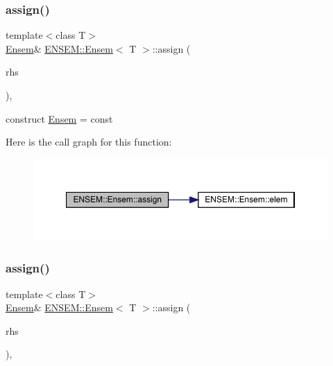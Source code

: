 \subsubsection{\texorpdfstring{assign()}{assign()}\hspace{0.1cm}{\footnotesize\ttfamily [7/12]}}
{\footnotesize\ttfamily template$<$class T$>$ \\
\mbox{\hyperlink{classENSEM_1_1Ensem}{Ensem}}\& \mbox{\hyperlink{classENSEM_1_1Ensem}{E\+N\+S\+E\+M\+::\+Ensem}}$<$ T $>$\+::assign (\begin{DoxyParamCaption}\item[{const typename \mbox{\hyperlink{structENSEM_1_1WordType}{Word\+Type}}$<$ T $>$\+::Type\+\_\+t \&}]{rhs }\end{DoxyParamCaption})\hspace{0.3cm}{\ttfamily [inline]}, {\ttfamily [protected]}}



construct \mbox{\hyperlink{classENSEM_1_1Ensem}{Ensem}} = const 

Here is the call graph for this function\+:
\nopagebreak
\begin{figure}[H]
\begin{center}
\leavevmode
\includegraphics[width=350pt]{d7/d3e/classENSEM_1_1Ensem_ae31c239c3dc966eaad70ec90489f5476_cgraph}
\end{center}
\end{figure}
\mbox{\label{classENSEM_1_1Ensem_ae31c239c3dc966eaad70ec90489f5476}} 
\subsubsection{\texorpdfstring{assign()}{assign()}\hspace{0.1cm}{\footnotesize\ttfamily [8/12]}}
{\footnotesize\ttfamily template$<$class T$>$ \\
\mbox{\hyperlink{classENSEM_1_1Ensem}{Ensem}}\& \mbox{\hyperlink{classENSEM_1_1Ensem}{E\+N\+S\+E\+M\+::\+Ensem}}$<$ T $>$\+::assign (\begin{DoxyParamCaption}\item[{const typename \mbox{\hyperlink{structENSEM_1_1WordType}{Word\+Type}}$<$ T $>$\+::Type\+\_\+t \&}]{rhs }\end{DoxyParamCaption})\hspace{0.3cm}{\ttfamily [inline]}, {\ttfamily [protected]}}



